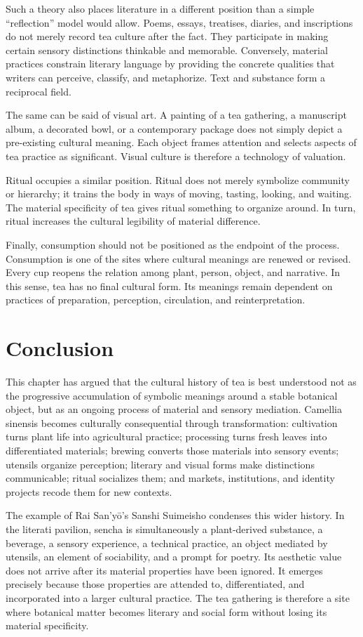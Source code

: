 \documentclass[11pt,a4paper]{article}
\begin{document}
Such a theory also places literature in a different position than a simple ``reflection'' model would allow. Poems, essays, treatises, diaries, and inscriptions do not merely record tea culture after the fact. They participate in making certain sensory distinctions thinkable and memorable. Conversely, material practices constrain literary language by providing the concrete qualities that writers can perceive, classify, and metaphorize. Text and substance form a reciprocal field.

The same can be said of visual art. A painting of a tea gathering, a manuscript album, a decorated bowl, or a contemporary package does not simply depict a pre-existing cultural meaning. Each object frames attention and selects aspects of tea practice as significant. Visual culture is therefore a technology of valuation.

Ritual occupies a similar position. Ritual does not merely symbolize community or hierarchy; it trains the body in ways of moving, tasting, looking, and waiting. The material specificity of tea gives ritual something to organize around. In turn, ritual increases the cultural legibility of material difference.

Finally, consumption should not be positioned as the endpoint of the process. Consumption is one of the sites where cultural meanings are renewed or revised. Every cup reopens the relation among plant, person, object, and narrative. In this sense, tea has no final cultural form. Its meanings remain dependent on practices of preparation, perception, circulation, and reinterpretation.

\section{Conclusion}

This chapter has argued that the cultural history of tea is best understood not as the progressive accumulation of symbolic meanings around a stable botanical object, but as an ongoing process of material and sensory mediation. Camellia sinensis becomes culturally consequential through transformation: cultivation turns plant life into agricultural practice; processing turns fresh leaves into differentiated materials; brewing converts those materials into sensory events; utensils organize perception; literary and visual forms make distinctions communicable; ritual socializes them; and markets, institutions, and identity projects recode them for new contexts.

The example of Rai San'yō's Sanshi Suimeisho condenses this wider history. In the literati pavilion, sencha is simultaneously a plant-derived substance, a beverage, a sensory experience, a technical practice, an object mediated by utensils, an element of sociability, and a prompt for poetry. Its aesthetic value does not arrive after its material properties have been ignored. It emerges precisely because those properties are attended to, differentiated, and incorporated into a larger cultural practice. The tea gathering is therefore a site where botanical matter becomes literary and social form without losing its material specificity.
\end{document}
